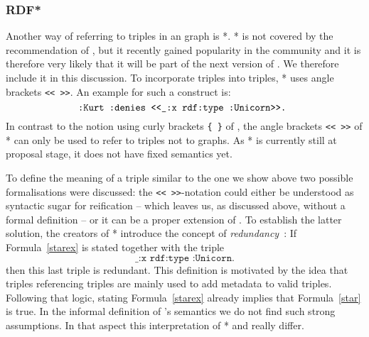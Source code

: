 % 
% 

\subsubsection{RDF*}
Another way of referring to \rdf triples in an \rdf graph is \rdf{}*\cite{rdfstar,rdfstarposter}. \rdf{}* is not covered by the \wwwc recommendation of \rdf, but it recently gained popularity in the community and 
it is therefore very likely that it will be part of the next version of \rdf. We therefore include it in this discussion.
To incorporate triples into triples, \rdf{}* uses angle brackets \texttt{<{}<  >{}>}. An example for such a construct is:
\begin{equation}\label{starex}
\verb!:Kurt :denies <<_:x rdf:type :Unicorn>>. !
\end{equation}
In contrast to the  notion using curly brackets \texttt{\{ \}} of \nthree, the angle brackets \texttt{<{}<  >{}>} of \rdf{}* can only be used to refer to triples not to graphs. 
As \rdf{}* is currently still at proposal stage, 
it does not have fixed semantics yet.

To define the meaning of a triple similar to the one we show above two possible formalisations were discussed: the 
\texttt{<{}<  >{}>}-notation could either  be understood as syntactic sugar for reification -- which leaves us, as discussed above, without a formal 
definition -- or it can be a proper extension of \rdf. 
To establish the latter solution, the creators of \rdf{}*  introduce the concept of \emph{redundancy}~\cite{rdfstar}: If Formula~\ref{starex} is stated together with the \rdf triple
\begin{equation}\label{star}
 \texttt{\_:x rdf:type :Unicorn.}
\end{equation}
then this last triple is redundant. This definition is motivated by the idea that triples referencing triples are mainly used to add metadata to valid triples. 
Following that logic, stating Formula~\ref{starex} already implies that Formula~\ref{star} is true. In the informal definition of \nthree's semantics we do not find such strong assumptions. 
In that aspect this interpretation of \rdf{}* and \nthree really differ. 

